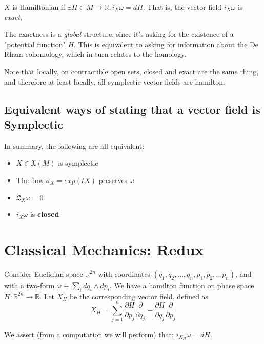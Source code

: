 \documentclass[11pt]{book}
\newcommand{\R}{\ensuremath{\mathbb R}}
\newcommand{\Lie}{\ensuremath{\mathfrak{L}}}
\newcommand{\vectorfield}{\ensuremath{\mathfrak{X}}}
\begin{document}
$X$ is Hamiltonian if $\exists H \in M \rightarrow \mathbb R, i_X \omega = dH$.
That is, the vector field $i_X \omega$ is \emph{exact}. 

The exactness is a \emph{global} structure, since it's asking for the existence
of a "potential function" $H$. This is equivalent to asking for information about
the De Rham cohomology, which in turn relates to the homology.

Note that locally, on contractible open sets, closed and exact are the same
thing, and therefore at least locally, all symplectic vector fields are
hamilton.

\subsection{Equivalent ways of stating that a vector field is Symplectic}

In summary, the following are all equivalent:
\begin{itemize}
        \item $X \in \vectorfield(M)$ is symplectic
        \item The flow $\sigma_X = exp(tX)$ preserves $\omega$
        \item $\Lie_X \omega = 0$
        \item $i_X \omega$ is \textbf{closed}
\end{itemize}

\section{Classical Mechanics: Redux}

Consider Euclidian space $\R^{2n}$ with coordinates $(q_1, q_2, \dots, q_n, p_1, p_2, \dots p_n)$,
and with a two-form $\omega \equiv \sum_i dq_i \wedge dp_i$. We have a hamilton function on phase space
$H: \R^{2n} \rightarrow \R$. Let $X_H$ be the corresponding vector field, defined
as
$$
X_H = \sum_{j=1}^n
\frac{\partial H}{\partial p_j} \frac{\partial}{\partial q_j} - 
\frac{\partial H}{\partial q_j}\frac{\partial}{\partial p_j}
$$

We assert (from a computation we will perform) that:
$i_{X_H} \omega = dH$.
\end{document}
